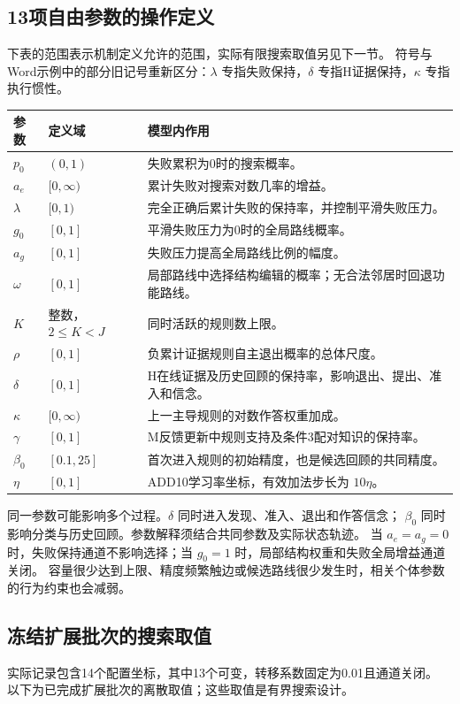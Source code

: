 \documentclass[11pt,a4paper]{article}
\numberwithin{equation}{section}
\begin{document}
\subsection{13项自由参数的操作定义}
下表的范围表示机制定义允许的范围，实际有限搜索取值另见下一节。
符号与Word示例中的部分旧记号重新区分：$\lambda$ 专指失败保持，$\delta$ 专指H证据保持，$\kappa$ 专指执行惯性。

{\small
\begin{longtable}{L{1.6cm}L{2.3cm}L{10.8cm}}
\toprule
参数 & 定义域 & 模型内作用\\
\midrule\endhead
$p_0$ & $(0,1)$ & 失败累积为0时的搜索概率。\\
$a_e$ & $[0,\infty)$ & 累计失败对搜索对数几率的增益。\\
$\lambda$ & $[0,1)$ & 完全正确后累计失败的保持率，并控制平滑失败压力。\\
$g_0$ & $[0,1]$ & 平滑失败压力为0时的全局路线概率。\\
$a_g$ & $[0,1]$ & 失败压力提高全局路线比例的幅度。\\
$\omega$ & $[0,1]$ & 局部路线中选择结构编辑的概率；无合法邻居时回退功能路线。\\
$K$ & 整数，$2\leq K<J$ & 同时活跃的规则数上限。\\
$\rho$ & $[0,1]$ & 负累计证据规则自主退出概率的总体尺度。\\
$\delta$ & $[0,1]$ & H在线证据及历史回顾的保持率，影响退出、提出、准入和信念。\\
$\kappa$ & $[0,\infty)$ & 上一主导规则的对数作答权重加成。\\
$\gamma$ & $[0,1]$ & M反馈更新中规则支持及条件3配对知识的保持率。\\
$\beta_0$ & $[0.1,25]$ & 首次进入规则的初始精度，也是候选回顾的共同精度。\\
$\eta$ & $[0,1]$ & ADD10学习率坐标，有效加法步长为 $10\eta$。\\
\bottomrule
\end{longtable}}

同一参数可能影响多个过程。$\delta$ 同时进入发现、准入、退出和作答信念；
$\beta_0$ 同时影响分类与历史回顾。参数解释须结合共同参数及实际状态轨迹。
当 $a_e=a_g=0$ 时，失败保持通道不影响选择；当 $g_0=1$ 时，局部结构权重和失败全局增益通道关闭。
容量很少达到上限、精度频繁触边或候选路线很少发生时，相关个体参数的行为约束也会减弱。

\subsection{冻结扩展批次的搜索取值}
实际记录包含14个配置坐标，其中13个可变，转移系数固定为0.01且通道关闭。
以下为已完成扩展批次的离散取值；这些取值是有界搜索设计。
\end{document}
